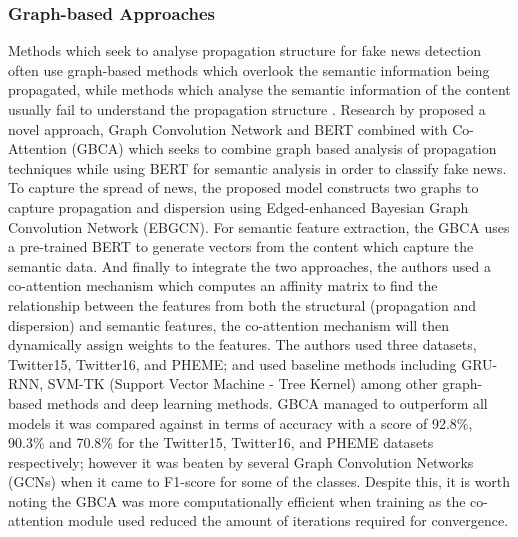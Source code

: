 \documentclass[stu,12pt,floatsintext,donotrepeattitle]{apa7}
\begin{document}
\subsubsection{Graph-based Approaches}
Methods which seek to analyse propagation structure for fake news detection often use graph-based methods which overlook the semantic information being propagated, while methods which analyse the semantic information of the content usually fail to understand the propagation structure \parencite{GBCA}. Research by \textcite{GBCA} proposed a novel approach, Graph Convolution Network and BERT combined with Co-Attention (GBCA) which seeks to combine graph based analysis of propagation techniques while using BERT for semantic analysis in order to classify fake news. To capture the spread of news, the proposed model constructs two graphs to capture propagation and dispersion using Edged-enhanced Bayesian Graph Convolution Network (EBGCN). For semantic feature extraction, the GBCA uses a pre-trained BERT to generate vectors from the content which capture the semantic data. And finally to integrate the two approaches, the authors used a co-attention mechanism which computes an affinity matrix to find the relationship between the features from both the structural (propagation and dispersion) and semantic features, the co-attention mechanism will then dynamically assign weights to the features. The authors used three datasets, Twitter15, Twitter16, and PHEME; and used baseline methods including GRU-RNN, SVM-TK (Support Vector Machine - Tree Kernel) among other graph-based methods and deep learning methods. GBCA managed to outperform all models it was compared against in terms of accuracy with a score of 92.8\%, 90.3\% and 70.8\% for the Twitter15, Twitter16, and PHEME datasets respectively; however it was beaten by several Graph Convolution Networks (GCNs) when it came to F1-score for some of the classes. Despite this, it is worth noting the GBCA was more computationally efficient when training as the co-attention module used reduced the amount of iterations required for convergence. 


\end{document}
